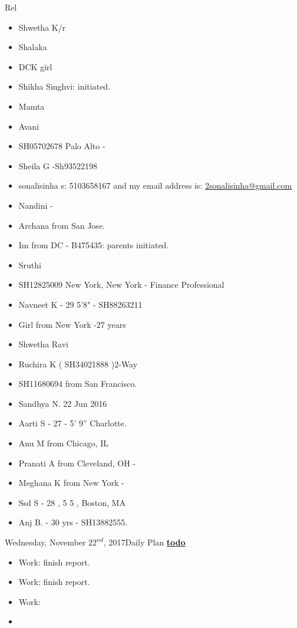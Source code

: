 \begin{columns}
\begin{column}{0.333\columnwidth}
  \begin{block}{Rel} 
    \begin{itemize} 
      \small \item \small Shwetha K/r
    \item \small Shalaka 
    \item \tiny DCK girl 
    \item \tiny  Shikha Singhvi: initiated.  
    \item \small Mamta
    \item \small Avani 
    \item \small SH05702678 Palo Alto - 
    \item \small Sheila G -Sh93522198  
    \item \small sonalisinha  s: 5103658167 and my email address is: \url{2sonalisinha@gmail.com}
    \item \small Nandini  - 
    \item \small Archana from San Jose. 
    \item \small Im from DC  - B475435: parents initiated. 
    \item \small Sruthi 
    \item \small SH12825009 New York, New York - Finance Professional 
    \item \small Navneet K  - 29 5'8" - SH88263211 
    \item \small Girl from New York  -27 years
    \item \small Shwetha Ravi 
    \item \small Ruchira K ( SH34021888 )2-Way           
    \item \small SH11680694 from San Francisco. 
    \item \small Sandhya N. 22 Jun 2016 
    \item \small Aarti S - 27 - 5' 9'' Charlotte.  
    \item \small Anu M from Chicago, IL 
    \item \small Pranati A from Cleveland, OH - 
    \item \small Meghana K from New York - 
    \item \small Ssd S - 28 , 5 5 , Boston, MA 
    \item \small Anj B. - 30 yrs - SH13882555.
    \end{itemize}
  \end{block} 
\begin{frame}{Wednesday, November $22^{nd}$, 2017}{Daily Plan}
\underline{\bf todo}\\
\begin{itemize}
\tiny \item \tiny Work: finish report.
\item \tiny Work: finish report.
\item \tiny Work:
\item \tiny
\end{itemize}


\end{frame}
\end{column}
\end{columns}
